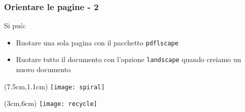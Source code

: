 \begin{frame}
 \frametitle{Orientare le pagine - 2}
 
 Si può:
 \begin{itemize}
  \item<1-> Ruotare una sola pagina con il pacchetto \texttt{pdflscape}
  \item<2-> Ruotare tutto il documento con l'opzione \texttt{landscape} quando 
creiamo un nuovo documento
 \end{itemize}

 
 \begin{textblock*}{5cm}(7.5cm,1.1cm)
   \texttt{[image: spiral]}
 \end{textblock*}
 
 \begin{textblock*}{5cm}(3cm,6cm)
   \texttt{[image: recycle]}
 \end{textblock*}
\end{frame}

